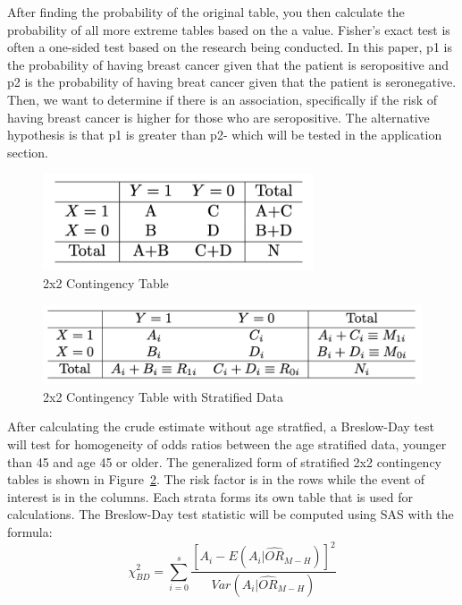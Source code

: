 \documentclass[12pt, titlepage]{article}
\begin{document}
After finding the probability of the original table, you then calculate the probability of 
all more extreme tables based on the a value. Fisher's exact test is often 
a one-sided test based on the research being conducted. In this paper, p1 is the
probability of having breast cancer given that the patient is seropositive
and p2 is the probability of having breat cancer given that the patient
is seronegative. Then, we want to determine if there is an association,
specifically if the risk of having breast cancer is higher for those who
are seropositive. The alternative hypothesis is that p1 is greater than p2-
which will be tested in the application section.

\begin{figure}[tbp]
  \centering
  \includegraphics[width=8cm]{table.png}
  \caption{2x2 Contingency Table}
  \label{fig:table}
\end{figure}

\begin{figure}[tbp]
  \centering
  \includegraphics[width=12cm]{2x2 stratified table.png}
  \caption{2x2 Contingency Table with Stratified Data}
  \label{fig:strat}
\end{figure}


After calculating the crude estimate without age stratfied, 
a Breslow-Day test will test for homogeneity of odds ratios between 
the age stratified data, younger than 45 and age 45 or older. The generalized
form of stratified 2x2 contingency tables is shown in Figure~\ref{fig:strat}.
The risk factor is in the rows while the event of interest is in the columns.
Each strata forms its own table that is used for calculations. 
The Breslow-Day test statistic will be computed using SAS with the formula:
\vspace{0.5cm}
\begin{equation}
  \chi_{BD}^2=\displaystyle\sum\limits_{i=0}^s\frac{[A_i-E(A_i|\hat{OR}_{M-H})]^2}{Var(A_i|\hat{OR}_{M-H})}
\end{equation}
\vspace{0.5cm}
\end{document}
